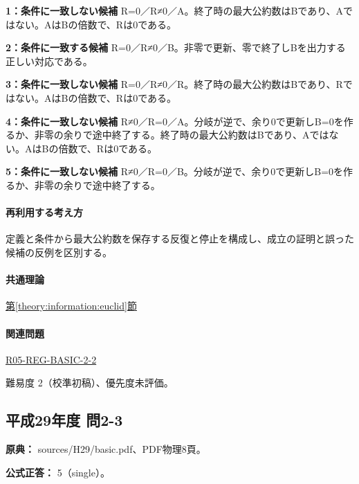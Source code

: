 \noindent\textbf{1：条件に一致しない候補} R=\allowbreak{}0／R≠0／A。終了時の最大公約数はBであり、Aではない。AはBの倍数で、Rは0である。\par

\noindent\textbf{2：条件に一致する候補} R=\allowbreak{}0／R≠0／B。非零で更新、零で終了しBを出力する正しい対応である。\par

\noindent\textbf{3：条件に一致しない候補} R=\allowbreak{}0／R≠0／R。終了時の最大公約数はBであり、Rではない。AはBの倍数で、Rは0である。\par

\noindent\textbf{4：条件に一致しない候補} R≠0／R=\allowbreak{}0／A。分岐が逆で、余り0で更新しB=\allowbreak{}0を作るか、非零の余りで途中終了する。終了時の最大公約数はBであり、Aではない。AはBの倍数で、Rは0である。\par

\noindent\textbf{5：条件に一致しない候補} R≠0／R=\allowbreak{}0／B。分岐が逆で、余り0で更新しB=\allowbreak{}0を作るか、非零の余りで途中終了する。\par

\paragraph{再利用する考え方} 定義と条件から最大公約数を保存する反復と停止を構成し、成立の証明と誤った候補の反例を区別する。

\paragraph{共通理論} \hyperref[theory:information:euclid]{第\ref*{theory:information:euclid}節}

\paragraph{関連問題} \hyperref[q:r05-reg-basic-2-2]{R05-REG-BASIC-2-2}

\par 難易度 2（校準初稿）、優先度未評価。

\subsection{平成29年度 問2-3}
\label{q:h29-reg-basic-2-3}

\noindent\textbf{原典：} sources/H29/basic.pdf、PDF物理8頁。

\textbf{公式正答：} 5（single）。

